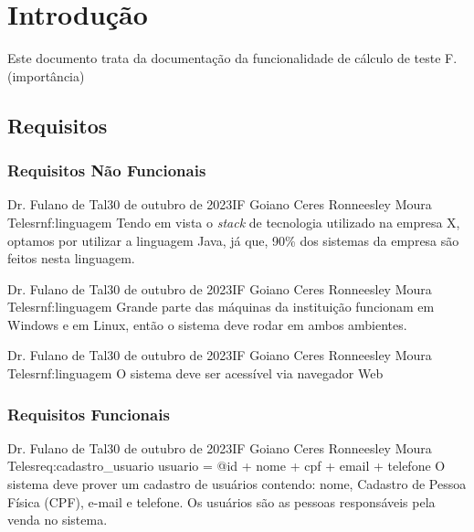 \chapter{Introdução}
\label{capitulo:introducao}

Este documento trata da documentação da funcionalidade de cálculo de teste F. (importância)

\section{Requisitos}


\subsection{Requisitos Não Funcionais}

{Dr. Fulano de Tal}{30 de outubro de 2023}{IF Goiano Ceres}
{Ronneesley Moura Teles}{rnf:linguagem}
{
Tendo em vista o \textit{stack} de tecnologia utilizado na empresa X,
optamos por utilizar a linguagem Java, já que, 90\% dos
sistemas da empresa são feitos nesta linguagem.
}

{Dr. Fulano de Tal}{30 de outubro de 2023}{IF Goiano Ceres}
{Ronneesley Moura Teles}{rnf:linguagem}
{
Grande parte das máquinas da instituição funcionam em Windows e em
Linux, então o sistema deve rodar em ambos ambientes.
}

{Dr. Fulano de Tal}{30 de outubro de 2023}{IF Goiano Ceres}
{Ronneesley Moura Teles}{rnf:linguagem}
{
O sistema deve ser acessível via navegador Web
}

\subsection{Requisitos Funcionais}

{Dr. Fulano de Tal}{30 de outubro de 2023}{IF Goiano Ceres}
{Ronneesley Moura Teles}{req:cadastro_usuario}
{usuario = @id + nome + cpf + email + telefone}
{
O sistema deve prover um cadastro de usuários contendo: nome,
Cadastro de Pessoa Física (CPF), e-mail e telefone.
Os usuários são as pessoas responsáveis pela venda no sistema.
}

